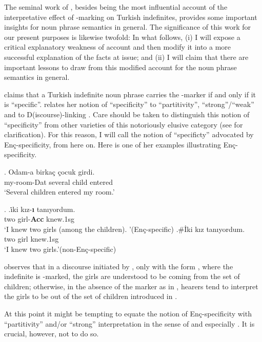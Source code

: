 \documentclass[11pt,a4paper]{article}
\newcommand{\encspec}{Enç-specific}
\begin{document}
The seminal work of , besides being the most influential
account of the interpretative effect of \acc-marking on Turkish
indefinites, provides some important insights for noun phrase
semantics in general. The significance of this work for our present
purposes is likewise twofold: In what follows, (i) I will expose a
critical explanatory weakness of  account and then modify
it into a more successful explanation of the facts at issue; and (ii)
I will claim that there are important lessons to draw from this
modified account for the noun phrase semantics in general.

 claims that a Turkish indefinite noun phrase carries the
\acc-marker if and only if it is ``specific''.   relates
her notion of ``specificity'' to ``partitivity'', ``strong''/``weak''
 and to D(iscourse)-linking . Care
should be taken to distinguish this notion of ``specificity'' from
other varieties of this notoriously elusive category (see
 for clarification). For this
reason, I will call the notion of ``specificty'' advocated by
 \encspec{ity}, from here on. Here is one of her examples
illustrating \encspec{ity}.

\exg.\label{exencintro}%
{Odam-a}  {birka\c{c}} {\c{c}ocuk} {girdi.}\\
{my-room-Dat} {several}  {child}  {entered}\\
`Several children entered my room.'

\ex.\label{exenc}
\ag.\label{exenca}{\.iki}  {k\i{}z-\textbf{\i}} {tan\i{}yordum}.\\
{two}  {girl-{\bf Acc}}  {knew.1sg}\\
`I knew two girls (among the children). '\hfill (\encspec)
\bg.\label{exencz}\#{\.Iki}  {k\i{}z}  {tan\i{}yordum.} \\
{two}  {girl}  {knew.1sg}\\
`I knew two girls.'\hfill (non-\encspec)

 observes that in a discourse initiated by
, only with the form , where the
indefinite  is \acc-marked, the girls are
understood to be coming from the set of children; otherwise, in the
absence of the marker as in , hearers tend to interpret
the girls to be out of the set of children introduced in
. 

At this point it might be tempting to equate the notion of
\encspec ity with ``partitivity'' and/or ``strong'' interpretation in
the sense of \cite{milsark77} and especially \cite{diesing92}. It is
crucial, however, not to do so.
\end{document}
